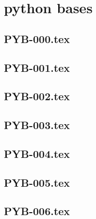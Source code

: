 \section*{python bases}
\newcommand{\xxexo}{PYB-000.tex} 
\subsection*{\xxexo} 
\graphicspath{{../../exos/python_bases/PYB-000/}}
 
 
\renewcommand{\xxexo}{PYB-001.tex} 
\subsection*{\xxexo} 
\graphicspath{{../../exos/python_bases/PYB-001/}}
 
 
\renewcommand{\xxexo}{PYB-002.tex} 
\subsection*{\xxexo} 
\graphicspath{{../../exos/python_bases/PYB-002/}}
 
 
\renewcommand{\xxexo}{PYB-003.tex} 
\subsection*{\xxexo} 
\graphicspath{{../../exos/python_bases/PYB-003/}}
 
 
\renewcommand{\xxexo}{PYB-004.tex} 
\subsection*{\xxexo} 
\graphicspath{{../../exos/python_bases/PYB-004/}}
 
 
\renewcommand{\xxexo}{PYB-005.tex} 
\subsection*{\xxexo} 
\graphicspath{{../../exos/python_bases/PYB-005/}}
 
 
\renewcommand{\xxexo}{PYB-006.tex} 
\subsection*{\xxexo} 
\graphicspath{{../../exos/python_bases/PYB-006/}}
 
 
